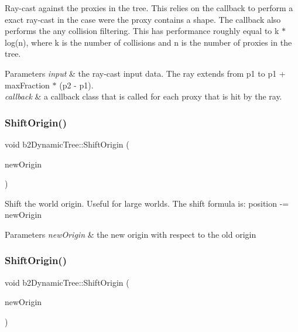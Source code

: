 Ray-\/cast against the proxies in the tree. This relies on the callback to perform a exact ray-\/cast in the case were the proxy contains a shape. The callback also performs the any collision filtering. This has performance roughly equal to k $\ast$ log(n), where k is the number of collisions and n is the number of proxies in the tree. 
\begin{DoxyParams}{Parameters}
{\em input} & the ray-\/cast input data. The ray extends from p1 to p1 + max\+Fraction $\ast$ (p2 -\/ p1). \\
\hline
{\em callback} & a callback class that is called for each proxy that is hit by the ray. \\
\hline
\end{DoxyParams}
\mbox{\label{classb2DynamicTree_af37ddfed6a5da97d5a78b09918d19ceb}} 
\subsubsection{\texorpdfstring{Shift\+Origin()}{ShiftOrigin()}\hspace{0.1cm}{\footnotesize\ttfamily [1/2]}}
{\footnotesize\ttfamily void b2\+Dynamic\+Tree\+::\+Shift\+Origin (\begin{DoxyParamCaption}\item[{const \hyperlink{structb2Vec2}{b2\+Vec2} \&}]{new\+Origin }\end{DoxyParamCaption})}

Shift the world origin. Useful for large worlds. The shift formula is\+: position -\/= new\+Origin 
\begin{DoxyParams}{Parameters}
{\em new\+Origin} & the new origin with respect to the old origin \\
\hline
\end{DoxyParams}
\mbox{\label{classb2DynamicTree_af37ddfed6a5da97d5a78b09918d19ceb}} 
\subsubsection{\texorpdfstring{Shift\+Origin()}{ShiftOrigin()}\hspace{0.1cm}{\footnotesize\ttfamily [2/2]}}
{\footnotesize\ttfamily void b2\+Dynamic\+Tree\+::\+Shift\+Origin (\begin{DoxyParamCaption}\item[{const \hyperlink{structb2Vec2}{b2\+Vec2} \&}]{new\+Origin }\end{DoxyParamCaption})}


